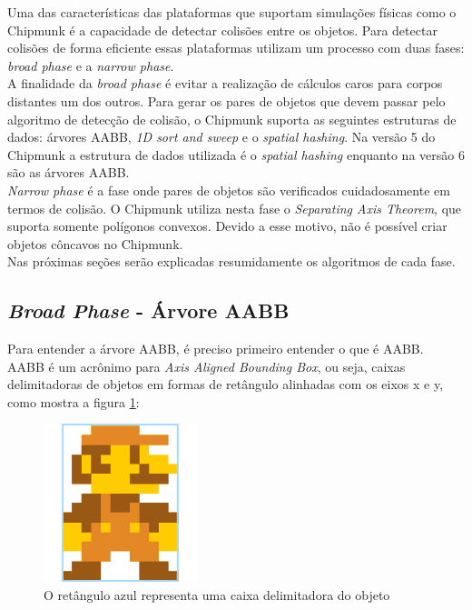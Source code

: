 Uma das características das plataformas que suportam simulações físicas como o Chipmunk é a capacidade de detectar colisões entre os objetos. 
Para detectar colisões de forma eficiente essas plataformas utilizam um processo com duas fases: \textit{broad phase} e a \textit{narrow phase}.\\

A finalidade da \textit{broad phase} é evitar a realização de cálculos caros para corpos distantes um dos outros. Para
gerar os pares de objetos que devem passar pelo algoritmo de detecção de colisão, o Chipmunk suporta as seguintes estruturas de dados:
árvores AABB, \textit{1D sort and sweep} e o \textit{spatial hashing}. Na versão 5 do Chipmunk a estrutura de dados utilizada é o \textit{spatial hashing} enquanto na versão 6 são as árvores AABB. \\

\textit{Narrow phase} é a fase onde pares de objetos são verificados cuidadosamente em termos de colisão. O Chipmunk utiliza nesta fase o \textit{Separating Axis Theorem}, que suporta somente polígonos convexos. Devido a esse motivo, não é possível criar objetos côncavos no Chipmunk. \\

Nas próximas seções serão explicadas resumidamente os algoritmos de cada fase.

\subsection{\textit{Broad Phase} - Árvore AABB}

Para entender a árvore AABB, é preciso primeiro entender o que é AABB. AABB é um acrônimo para \textit{Axis Aligned Bounding Box}, ou seja, caixas delimitadoras de objetos 
em formas de retângulo alinhadas com os eixos x e y, como mostra a figura \ref{mariobb}:

\begin{figure}[!htbp]
  \centering
  \includegraphics[scale=0.3]{mario_bb.png} 
  \caption{O retângulo azul representa uma caixa delimitadora do objeto}
  \label{mariobb}
\end{figure}

